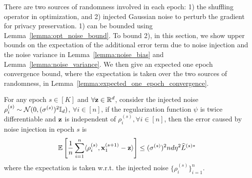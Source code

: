 There are two sources of randomness involved in each epoch: 1) the shuffling operator in optimization, and 2) injected Gaussian noise to perturb the gradient for privacy preservation. 
1) can be bounded using Lemma~\ref{lemma:opt_noise_bound}. To bound 2),
in this section, we show upper bounds on the expectation of the additional error term due to noise injection and the noise variance in Lemma~\ref{lemma:noise_bias} and Lemma~\ref{lemma:noise_variance}. We then give an expected one epoch convergence bound, where the expectation is taken over the two sources of randomness, in Lemma~\ref{lemma:expected_one_epoch_convergence}. 




\begin{lemma}
\label{lemma:noise_bias}
    For any epoch $s\in [K]$ and $\forall {\mathbf{z}} \in \mathbb{R}^{d}$, consider the injected noise $\rho_{i}^{(s)} \sim {\mathcal{N}}(0, (\sigma^{(s)})^2 {\mathbb{I}}_d)$, $\forall i\in [n]$, if the regularization function $\psi$ is twice differentiable and ${\mathbf{z}}$ is independent of $\rho_i^{(s)}, \forall i\in [n]$, then the error caused by noise injection in epoch $s$ is
    \begin{align}
        \mathbb{E}\left[\frac{1}{n}\sum_{i=1}^{n} \langle \rho_i^{(s)}, {\mathbf{x}}_1^{(s+1)} - {\mathbf{z}} \rangle \right] 
        \leq (\sigma^{(s)})^2 nd \eta^2 \widehat{L}^{(s)*}
    \end{align}
    where the expectation is taken w.r.t. the injected noise $\{\rho_i^{(s)}\}_{i=1}^{n}$.
\end{lemma}



